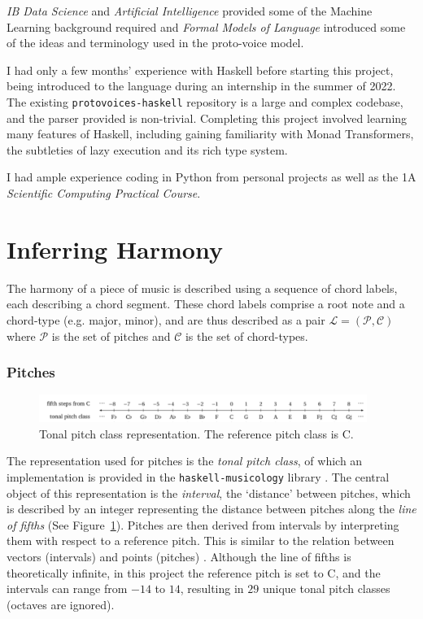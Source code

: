 \documentclass[12pt,a4paper,twoside,openany]{report} \usepackage[pdfborder={0 0 0}]{hyperref}    %
\theoremstyle{definition} \newtheorem{definition}{Definition}[section]
\begin{document}
\textit{IB Data Science} and \textit{Artificial Intelligence} provided some of the Machine Learning background required
and \textit{Formal Models of Language} introduced some of the ideas and terminology used in the proto-voice model.

I had only a few months' experience with Haskell before starting this project, being introduced to the language during an internship in the summer of 2022. 
The existing \texttt{protovoices-haskell} repository is a large and complex codebase, and the parser provided is non-trivial. 
Completing this project involved learning many features of Haskell, including gaining familiarity with Monad Transformers, the subtleties of lazy execution and its rich type system.

I had ample experience coding in Python from personal projects as well as the 1A \textit{Scientific
Computing Practical Course}.

\section{Inferring Harmony}
\label{sec:inferringHarmony}

The harmony of a piece of music is described using a sequence of chord labels, 
each describing a chord segment. 
These chord labels comprise a root note and a chord-type (e.g. major, minor), and are thus described as a pair $\mathcal{L}
= (\mathcal{P}, \mathcal{C})$ where $\mathcal{P}$ is the set of pitches and $\mathcal{C}$ is the set of chord-types. 

\subsubsection{Pitches}
\label{sub:pitches}

\begin{figure}[h]
  \begin{center}
    \includegraphics[width=0.95\textwidth]{figs/intro/tpc.png}
  \end{center}
  \caption{Tonal pitch class representation. The reference pitch class is C.}
  \label{fig:tpc}
\end{figure}
The representation used for pitches is the \textit{tonal pitch class}, of which an implementation is provided in the
\texttt{haskell-musicology} library \cite{finkensiepHaskellmusicologyScientificMusic2019}. The central object of this
representation is the \textit{interval}, the `distance' between pitches, which is described by an integer representing the distance between pitches
along the \textit{line of fifths} (See Figure~\ref{fig:tpc}). Pitches are then derived from intervals by interpreting them with respect to a reference pitch.
This is similar to the relation between vectors (intervals) and points (pitches)
\cite{finkensiepHaskellmusicologyScientificMusic2019}. Although the line of fifths is theoretically infinite, in this
project the reference pitch is set to C, and the intervals can range from $-14$ to $14$, resulting in $29$ unique tonal pitch
classes (octaves are ignored).
\end{document}
